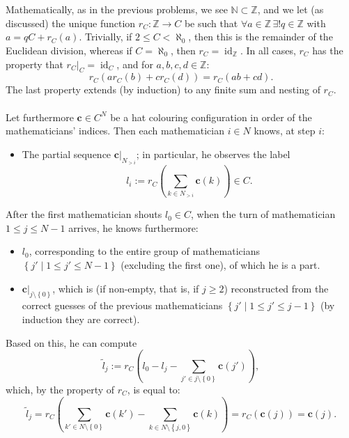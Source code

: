 \documentclass[11pt, a4paper, oneside]{article}
\theoremstyle{remark}
\theoremstyle{lemma}
\begin{document}
\\\\
Mathematically, as in the previous problems, we see \(\mathbb{N} \subset \mathbb{Z}\), and we let (as discussed) the unique function \(r_{C} : \mathbb{Z} \rightarrow C\) be such that \(\forall a \in \mathbb{Z}\, \exists! q \in \mathbb{Z}\) with \(a = qC + r_{C}(a)\). Trivially, if \(2 \leq C < \aleph_0\), then this is the remainder of the Euclidean division, whereas if \(C = \aleph_0\), then \(r_C = \operatorname{id}_{\mathbb{Z}}\). In all cases, \(r_C\) has the property that \(r_{C}\big|_{C} = \operatorname{id}_{C}\), and for \(a, b, c, d \in \mathbb{Z}\):
\[
r_{C}\left( a r_{C}\left( b \right) + c r_{C}\left( d \right) \right) = r_{C}\left( ab + cd \right).
\]
The last property extends (by induction) to any finite sum and nesting of \(r_{C}\).
\\\\
Let furthermore \(\mathbf{c} \in C^N\) be a hat colouring configuration in order of the mathematicians’ indices. Then each mathematician \(i \in N\) knows, at step \(i\):
\begin{itemize}
    \item The partial sequence \(\left.\mathbf{c}\right|_{N_{>i}}\); in particular, he observes the label
    \[
    l_i := r_{C}\left( \sum_{k \in N_{>i}} \mathbf{c}(k) \right) \in C.
    \]
\end{itemize}
After the first mathematician shouts \(l_0 \in C\), when the turn of mathematician \(1 \leq j \leq N - 1\) arrives, he knows furthermore:
\begin{itemize}
    \item \(l_0\), corresponding to the entire group of mathematicians \(\left\{ j' \mid 1 \leq j' \leq N - 1 \right\}\) (excluding the first one), of which he is a part.
    \item \(\left.\mathbf{c}\right|_{j \setminus \left\{ 0 \right\}}\), which is (if non-empty, that is, if \(j \geq 2\)) reconstructed from the correct guesses of the previous mathematicians \(\left\{ j' \mid 1 \leq j' \leq j - 1 \right\}\) (by induction they are correct).
\end{itemize}
Based on this, he can compute
\[
\tilde{l}_j := r_{C}\left( l_0 - l_j - \sum_{j' \in j \setminus \left\{ 0 \right\}} \mathbf{c}(j') \right),
\]
which, by the property of \(r_C\), is equal to:
\[
\tilde{l}_j = r_{C}\left( \sum_{k' \in N \setminus \left\{ 0 \right\}} \mathbf{c}(k') - \sum_{k \in N \setminus \left\{ j, 0 \right\}} \mathbf{c}(k) \right) = r_{C}\left( \mathbf{c}(j) \right) = \mathbf{c}(j).
\]
\end{document}
